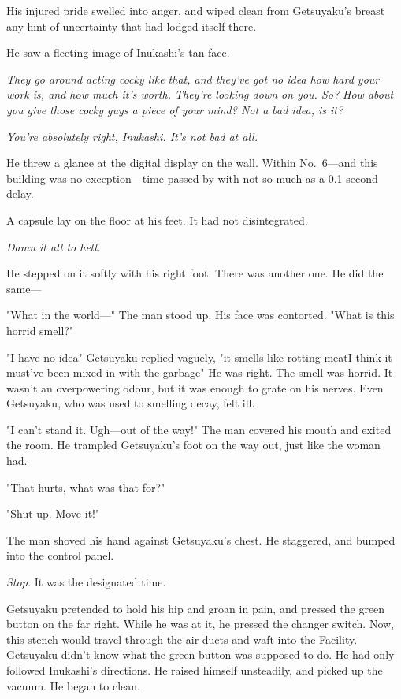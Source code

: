 His injured pride swelled into anger, and wiped clean from Getsuyaku's
breast any hint of uncertainty that had lodged itself there.

He saw a fleeting image of Inukashi's tan face.

\emph{They go around acting cocky like that, and they've got no idea how hard
your work is, and how much it's worth. They're looking down on you. So?
How about you give those cocky guys a piece of your mind? Not a bad
idea, is it?}

\emph{You're absolutely right, Inukashi. It's not bad at all.}

He threw a glance at the digital display on the wall. Within No.~6---and
this building was no exception---time passed by with not so much as a
0.1-second delay.

A capsule lay on the floor at his feet. It had not disintegrated.

\emph{Damn it all to hell.}

He stepped on it softly with his right foot. There was another one. He
did the same---

"What in the world---" The man stood up. His face was contorted. "What is
this horrid smell?"

"I have no idea\el " Getsuyaku replied vaguely, "it smells like rotting
meat\el I think it must've been mixed in with the garbage\el " He was
right. The smell was horrid. It wasn't an overpowering odour, but it was
enough to grate on his nerves. Even Getsuyaku, who was used to smelling
decay, felt ill.

"I can't stand it. Ugh---out of the way!" The man covered his mouth and
exited the room. He trampled Getsuyaku's foot on the way out, just like
the woman had.

"That hurts, what was that for?"

"Shut up. Move it!"

The man shoved his hand against Getsuyaku's chest. He staggered, and
bumped into the control panel.

\emph{Stop.} It was the designated time.

Getsuyaku pretended to hold his hip and groan in pain, and pressed the
green button on the far right. While he was at it, he pressed the
changer switch. Now, this stench would travel through the air ducts and
waft into the Facility. Getsuyaku didn't know what the green button was
supposed to do. He had only followed Inukashi's directions. He raised
himself unsteadily, and picked up the vacuum. He began to clean.

